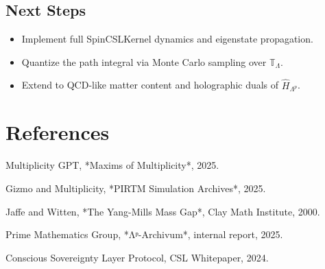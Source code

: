 \documentclass[11pt]{article}
\begin{document}
\subsection*{Next Steps}
\begin{itemize}
    \item Implement full SpinCSLKernel dynamics and eigenstate propagation.
    \item Quantize the path integral via Monte Carlo sampling over $\mathbb{T}_\Lambda$.
    \item Extend to QCD-like matter content and holographic duals of $\hat{H}_{\Lambda^p}$.
\end{itemize}

\section*{References}

\begin{enumerate}[label={[\arabic*]}]
    \item Multiplicity GPT, *Maxims of Multiplicity*, 2025.
    \item Gizmo and Multiplicity, *PIRTM Simulation Archives*, 2025.
    \item Jaffe and Witten, *The Yang-Mills Mass Gap*, Clay Math Institute, 2000.
    \item Prime Mathematics Group, *Λᵖ-Archivum*, internal report, 2025.
    \item Conscious Sovereignty Layer Protocol, CSL Whitepaper, 2024.
\end{enumerate}
\end{document}
